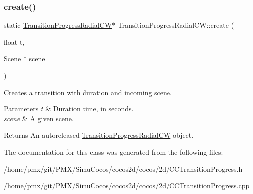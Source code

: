 \subsubsection{\texorpdfstring{create()}{create()}\hspace{0.1cm}{\footnotesize\ttfamily [2/2]}}
{\footnotesize\ttfamily static \hyperlink{classTransitionProgressRadialCW}{Transition\+Progress\+Radial\+CW}$\ast$ Transition\+Progress\+Radial\+C\+W\+::create (\begin{DoxyParamCaption}\item[{float}]{t,  }\item[{\hyperlink{classScene}{Scene} $\ast$}]{scene }\end{DoxyParamCaption})\hspace{0.3cm}{\ttfamily [static]}}

Creates a transition with duration and incoming scene.


\begin{DoxyParams}{Parameters}
{\em t} & Duration time, in seconds. \\
\hline
{\em scene} & A given scene. \\
\hline
\end{DoxyParams}
\begin{DoxyReturn}{Returns}
An autoreleased \hyperlink{classTransitionProgressRadialCW}{Transition\+Progress\+Radial\+CW} object. 
\end{DoxyReturn}


The documentation for this class was generated from the following files\+:\begin{DoxyCompactItemize}
\item 
/home/pmx/git/\+P\+M\+X/\+Simu\+Cocos/cocos2d/cocos/2d/C\+C\+Transition\+Progress.\+h\item 
/home/pmx/git/\+P\+M\+X/\+Simu\+Cocos/cocos2d/cocos/2d/C\+C\+Transition\+Progress.\+cpp\end{DoxyCompactItemize}
